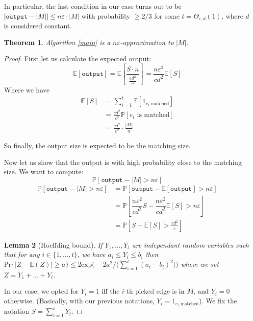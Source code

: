 \documentclass{jams-l}
\newtheorem{theorem}{Theorem}[section]
\newtheorem{lemma}[theorem]{Lemma}
\theoremstyle{definition}
\theoremstyle{remark}
\numberwithin{equation}{section}
\begin{document}
In particular, the last condition in our case turns out to be $|\texttt{output} - |M|| \leq n\varepsilon \cdot |M|$ with probability $\geq 2/3$  for some $t = \Theta_{\varepsilon,d}(1)$, where $d$ is considered constant.

\begin{theorem}
Algorithm \ref{main} is a $n \varepsilon$-approximation to $|M|$.
\end{theorem}
\begin{proof}
First let us calculate the expected output:
\[
\mathbb{E}[\texttt{output}] = \mathbb{E}\left [\dfrac{S \cdot n}{\frac{cd^2}{\varepsilon^2}} \right ]
=\dfrac{n\varepsilon^2}{cd^2}\mathbb{E}[S]
\]
Where we have
\begin{align*}
\mathbb{E}[S]&= \sum_{i=1}^t \mathbb{E}[1_{e_i\text{ matched}}] \\
	&= \frac{cd^2}{\varepsilon^2} \mathbb{P}[e_i\text{ is matched}] \\
	&=\frac{cd^2}{\varepsilon^2} \cdot \frac{|M|}{n}
\end{align*}

So finally, the output size is expected to be the matching size.

Now let us show that the output is with high probability close to the matching size.
We want to compute:
\[
\mathbb{P}[\texttt{output} - |M| > n\varepsilon]
\]
\begin{align*}
\mathbb{P}[\texttt{output} - |M| > n\varepsilon] &= \mathbb{P}[\texttt{output} - \mathbb{E}[\texttt{output}] > n\varepsilon]\\
	&=\mathbb{P}[\dfrac{n\varepsilon^2}{cd^2}S - \dfrac{n\varepsilon^2}{cd^2}\mathbb{E}[S] 
> n\varepsilon]\\
	&=\mathbb{P}[S - \mathbb{E}[S] >  \frac{cd^2}{\varepsilon}]
\end{align*}


\begin{lemma}[Hoeffding bound] If $Y_1,\dots,Y_t$ are independant random variables such that for any $i \in\{1,\dots,t\}$, we have $a_i \leq Y_i \leq b_i$ then $\mathrm{Pr}\{|Z - \mathbb{E}(Z)| \geq a \} \leq 2 \mathrm{exp}\Big(-2a^2/\big(\sum_{i=1}^t(a_i-b_i)^2\big)\Big)$ where we set $Z = Y_1+\dots+Y_t$.
\end{lemma}

In our case, we opted for $Y_i=1$ iff the $i$-th picked edge is in $M$, 
and $Y_i = 0$ otherwise. (Basically, with our previous notations, $Y_i=1_{e_i\text{ matched}}$).
We fix the notation $S = \sum_{i=1}^t Y_i$. 


\end{proof}
\end{document}

